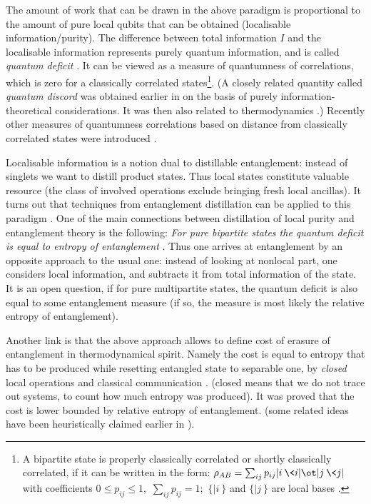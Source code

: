 \documentclass[twocolumn,aps,rmp]{revtex4}
\begin{document}
The amount of work that can be drawn in the above paradigm is
proportional to the amount of pure local qubits that can be obtained
(localisable information/purity). The difference between total
information $I$ and the localisable information represents purely
quantum information, and is called {\it quantum deficit}
\cite{OHHH2001}. It can be viewed as a measure of quantumness of correlations, which is zero for a classically correlated states\footnote {A bipartite state is properly classically correlated or shortly classically correlated, if it can be written in the form: $\rho_{AB}= \sum_{ij} p_{ij}|i\>\<i|\ot |j\>\<j|$ with coefficients $
0 \leq p _{ij}\leq 1$,\, $\sum_{ij} p_{ij} =1$;\, $\{|i\>\}$ and  $\{|j\>\}$ are local bases \cite{OHHH2001}.}. (A closely related quantity called {\it quantum  discord} was obtained earlier in \cite{Zurek-demons-02} on the basis
of purely information-theoretical considerations. It was then also
related to thermodynamics \cite{Zurek-discord}.) Recently other measures of quantumness correlations
based on distance from classically correlated states  were  introduced \cite {GroismanKM2007,SaiTohRN2007}.


Localisable information is a notion dual to distillable entanglement:
instead of singlets we want to distill product states.  Thus local
states constitute valuable resource (the class of involved operations
exclude bringing fresh local ancillas). It turns out that techniques
from entanglement distillation can be applied to this paradigm
\cite{nlocc,SynakHH04}. One of the main connections between
distillation of local purity and entanglement theory is the following:
{\it For pure bipartite states the quantum deficit is equal to entropy
  of entanglement} \cite{nlocc}. Thus one arrives at entanglement by
an opposite approach to the usual one: instead of looking at nonlocal
part, one considers local information, and subtracts it from total
information of the state. It is an open question, if for pure
multipartite states, the quantum deficit is also equal to some
entanglement measure (if so, the measure is most likely the relative
entropy of entanglement).

Another link is that the above approach allows to define cost of
erasure of entanglement in thermodynamical spirit. Namely the cost is
equal to entropy that has to be produced while resetting entangled
state to separable one, by {\it closed} local operations and classical
communication \cite{huge-delta}. (closed means that we do not trace
out systems, to count how much entropy was produced).  It was proved
that the cost is lower bounded by relative entropy of
entanglement. (some related ideas have been heuristically claimed
earlier in \cite{Vedral1999}).
\end{document}
